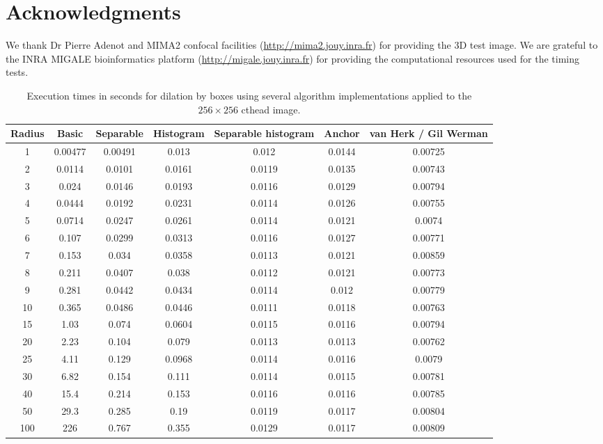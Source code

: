 \documentclass{InsightArticle}
\begin{document}
\section{Acknowledgments}
We thank Dr Pierre Adenot and MIMA2 confocal facilities
(\url{http://mima2.jouy.inra.fr}) for providing the 3D test image.
We are grateful to the INRA MIGALE bioinformatics platform
(\url{http://migale.jouy.inra.fr}) for providing the computational resources
used for the timing tests.

\appendix

\begin{table}[phtb]
\centering
\begin{tabular}{ccccccc}
\hline
Radius	&	Basic	&	Separable	&	Histogram	&	Separable histogram	&	Anchor	&	van Herk / Gil Werman	\\
\hline
1	&	0.00477	&	0.00491	&	0.013	&	0.012	&	0.0144	&	0.00725	\\
2	&	0.0114	&	0.0101	&	0.0161	&	0.0119	&	0.0135	&	0.00743	\\
3	&	0.024	&	0.0146	&	0.0193	&	0.0116	&	0.0129	&	0.00794	\\
4	&	0.0444	&	0.0192	&	0.0231	&	0.0114	&	0.0126	&	0.00755	\\
5	&	0.0714	&	0.0247	&	0.0261	&	0.0114	&	0.0121	&	0.0074	\\
6	&	0.107	&	0.0299	&	0.0313	&	0.0116	&	0.0127	&	0.00771	\\
7	&	0.153	&	0.034	&	0.0358	&	0.0113	&	0.0121	&	0.00859	\\
8	&	0.211	&	0.0407	&	0.038	&	0.0112	&	0.0121	&	0.00773	\\
9	&	0.281	&	0.0442	&	0.0434	&	0.0114	&	0.012	&	0.00779	\\
10	&	0.365	&	0.0486	&	0.0446	&	0.0111	&	0.0118	&	0.00763	\\
15	&	1.03	&	0.074	&	0.0604	&	0.0115	&	0.0116	&	0.00794	\\
20	&	2.23	&	0.104	&	0.079	&	0.0113	&	0.0113	&	0.00762	\\
25	&	4.11	&	0.129	&	0.0968	&	0.0114	&	0.0116	&	0.0079	\\
30	&	6.82	&	0.154	&	0.111	&	0.0114	&	0.0115	&	0.00781	\\
40	&	15.4	&	0.214	&	0.153	&	0.0116	&	0.0116	&	0.00785	\\
50	&	29.3	&	0.285	&	0.19	&	0.0119	&	0.0117	&	0.00804	\\
100	&	226	&	0.767	&	0.355	&	0.0129	&	0.0117	&	0.00809	\\
\hline
\hline
\end{tabular}
\caption{Execution times in seconds for dilation by boxes using several algorithm implementations applied to the $256 \times 256$ cthead image.\label{tab:perfDilation}}
\end{table}
\end{document}
